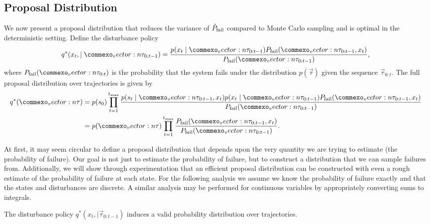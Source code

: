 \subsection{Proposal Distribution}

We now present a proposal distribution that reduces the variance of $\hat{P}_{\rm fail}$ compared to Monte Carlo sampling and is optimal in the deterministic setting. Define the disturbance policy
\begin{equation}
    q^*(x_t, \mid \vec{\tau}_{0:t-1}) = \frac{p(x_t \mid \vec{\tau}_{0:t-1}) P_{\rm fail}(\vec{\tau}_{0:t-1}, x_t)}{P_{\rm fail}(\vec{\tau}_{0:t-1})} \text{,} \label{eq:disturbance_policy}
\end{equation}
where $P_{\rm fail}(\vec{\tau}_{0:t})$ is the probability that the system fails under the distribution $p(\vec{\tau})$ given the sequence $\vec{\tau}_{0:t}$. The full proposal distribution over trajectories is given by 
\begin{align}
    q^*(\vec{\tau}) &= p(s_0) \prod_{t=1}^{t_{\rm max}} \frac{p(s_t \mid \vec{\tau}_{0:t-1}, x_t)  p(x_t \mid \vec{\tau}_{0:t-1}) P_{\rm fail}(\vec{\tau}_{0:t-1}, x_t)}{P_{\rm fail}(\vec{\tau}_{0:t-1})} \\
    &= p(\vec{\tau}) \prod_{t=1}^{t_{\rm max}} \frac{P_{\rm fail}(\vec{\tau}_{0:t-1}, x_t)}{P_{\rm fail}(\vec{\tau}_{0:t-1})} \text{.} \label{eq:full_proposal}
\end{align}

At first, it may seem circular to define a proposal distribution that depends upon the very quantity we are trying to estimate (the probability of failure). Our goal is not just to estimate the probability of failure, but to construct a distribution that we can sample failures from.  Additionally, we will show through experimentation that an efficient proposal distribution can be constructed with even a rough estimate of the probability of failure at each state. For the following analysis we assume we know the probability of failure exactly and that the states and disturbances are discrete. A similar analysis may be performed for continuous variables by appropriately converting sums to integrals.

\begin{proposition} 
The disturbance policy $q^*(x_t, \mid \vec{\tau}_{0:t-1})$ induces a valid probability distribution over trajectories.
\end{proposition}

